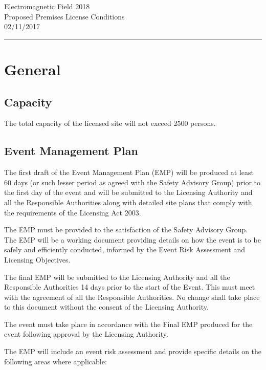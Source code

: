 

\begin{center}
{\Large Electromagnetic Field 2018} \\
{\large Proposed Premises License Conditions} \\
02/11/2017
\end{center}
\hrule
\section{General}\label{general}

\subsection{Capacity}\label{capacity}

The total capacity of the licensed site will not exceed 2500 persons.

\subsection{Event Management Plan}\label{event-management-plan}

The first draft of the Event Management Plan (EMP) will be produced at
least 60 days (or such lesser period as agreed with the Safety Advisory
Group) prior to the first day of the event and will be submitted to the
Licensing Authority and all the Responsible Authorities along with
detailed site plans that comply with the requirements of the Licensing
Act 2003.

The EMP must be provided to the satisfaction of the Safety Advisory
Group. The EMP will be a working document providing details on how the
event is to be safely and efficiently conducted, informed by the Event
Risk Assessment and Licensing Objectives.

The final EMP will be submitted to the Licensing Authority and all the
Responsible Authorities 14 days prior to the start of the Event. This
must meet with the agreement of all the Responsible Authorities. No
change shall take place to this document without the consent of the
Licensing Authority.

The event must take place in accordance with the Final EMP produced for
the event following approval by the Licensing Authority.

The EMP will include an event risk assessment and provide specific
details on the following areas where applicable:

